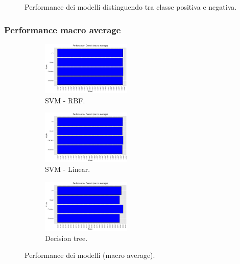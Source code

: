 \begin{figure}[H]

\caption{Performance dei modelli distinguendo tra classe positiva e negativa.}
\end{figure}

\subsubsection{Performance macro average}
\begin{figure}[H]
	\centering
	\begin{subfigure}[b]{0.3\textwidth}
		\includegraphics[width=4.25cm]{../images/svmRadial_performance.png}
		\caption{SVM - RBF.}
	\end{subfigure}
	\begin{subfigure}[b]{0.3\textwidth}
		\includegraphics[width=4.25cm]{../images/svmLinear_performance.png}
		\caption{SVM - Linear.}
	\end{subfigure}
	\begin{subfigure}[b]{0.3\textwidth}
		\includegraphics[width=4.25cm]{../images/rpart_performance.png}
		\caption{Decision tree.}
	\end{subfigure}
	\caption{Performance dei modelli (macro average).}
\end{figure}


